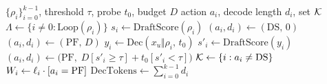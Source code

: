 \begin{algorithm}[t]
\caption{Probe admission, replacing \eqref{eq:drej}.
$\Lambda$ is the repeated-loop set.
$y_i$ is a probe of $t_0$ tokens and $s'_i$ is its draft score.
Iverson brackets select the decode length.
$\mathrm{DS}$ applies only to $\Lambda$.}
\label{alg:app}
\small
\begin{algorithmic}[1]
\REQUIRE $\{\rho_i\}_{i=0}^{k-1}$, threshold $\tau$, probe $t_0$, budget $D$
\ENSURE action $a_i$, decode length $d_i$, set $\mathcal{K}$
\STATE $\Lambda\leftarrow\{i\neq 0:\mathrm{Loop}(\rho_i)\}$
  \STATE $s_i\leftarrow\mathrm{DraftScore}(\rho_i)$
    \STATE $(a_i,d_i)\leftarrow(\mathrm{DS},\,0)$ 
    \STATE $(a_i,d_i)\leftarrow(\mathrm{PF},\,D)$
  \ELSE
    \STATE $y_i\leftarrow\mathrm{Dec}(x_u\Vert\rho_i,\,t_0)$
    \STATE $s'_i\leftarrow\mathrm{DraftScore}(y_i)$
    \STATE $(a_i,d_i)\leftarrow\big(\mathrm{PF},\; D[s'_i\ge\tau]+t_0[s'_i<\tau]\big)$
  \ENDIF
\ENDFOR
\STATE $\mathcal{K}\leftarrow\{i:a_i\neq\mathrm{DS}\}$
\STATE $W_i\leftarrow\ell_i\cdot[a_i=\mathrm{PF}]$
\STATE $\mathrm{DecTokens}\leftarrow\sum_{i=0}^{k-1} d_i$
\end{algorithmic}
\end{algorithm}

